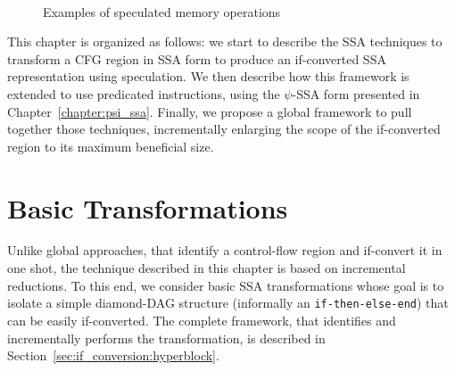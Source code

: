 \begin{figure}[h]
\hfill
{}\\
\hfill
{}
\caption{Examples of speculated memory operations}
\label{fig:spec}
\end{figure}




This chapter is organized as follows: 
we start to describe the SSA techniques to transform a CFG region in SSA form to produce an if-converted SSA representation using speculation. 
We then describe how this framework is extended to use predicated instructions, using the $\psi$-SSA form presented in Chapter~\ref{chapter:psi_ssa}. 
Finally, we propose a global framework to pull together those techniques, incrementally enlarging the scope of the if-converted region to its maximum beneficial size.

\section{Basic Transformations}
\label{sec:basic}

Unlike global approaches, that identify a control-flow region and if-convert it in one shot, the technique described in this chapter is based on incremental reductions. 
To this end, we consider basic SSA transformations whose goal is to isolate a simple diamond-DAG structure (informally an \texttt{if-then-else-end}) that can be easily if-converted. 
The complete framework, that identifies and incrementally performs the transformation, is described in Section~\ref{sec:if_conversion:hyperblock}.

